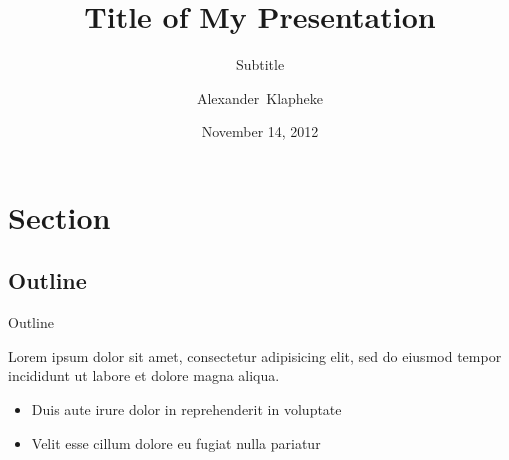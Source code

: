 \documentclass[xetex,serif]{beamer}
\title[Title]{Title of My Presentation}
\subtitle{Subtitle}
\author[Klapheke]{Alexander~Klapheke}
\institute[Harvard]{Harvard~University}
\date{November 14, 2012}
\begin{document}
\section{}
\begin{frame}
	\titlepage
\end{frame}

\section{Section}
\subsection{Outline}
\begin{frame}{Outline}
	\vfill

	Lorem ipsum dolor sit amet, consectetur adipisicing elit, sed do eiusmod tempor incididunt ut labore et dolore magna aliqua.

	\vfill

	\begin{itemize}
		\item Duis aute irure dolor in reprehenderit in voluptate
		\item Velit esse cillum dolore eu fugiat nulla pariatur
	\end{itemize}

	\vfill

\end{frame}
\end{document}
